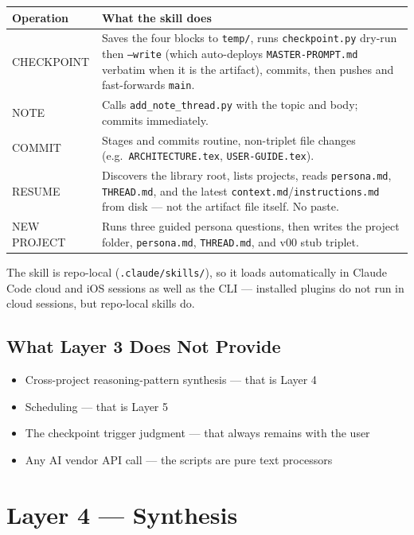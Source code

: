 \documentclass[12pt,letterpaper]{article}
\begin{document}
\begin{center}
\begin{tabular}{@{}lp{8.5cm}@{}}
\toprule
\textbf{Operation} & \textbf{What the skill does} \\
\midrule
CHECKPOINT & Saves the four blocks to \texttt{temp/}, runs
\texttt{checkpoint.py} dry-run then \texttt{--write} (which
auto-deploys \texttt{MASTER-PROMPT.md} verbatim when it is the
artifact), commits, then pushes and fast-forwards \texttt{main}. \\
NOTE & Calls \texttt{add\_note\_thread.py} with the topic and body;
commits immediately. \\
COMMIT & Stages and commits routine, non-triplet file changes (e.g.\
\texttt{ARCHITECTURE.tex}, \texttt{USER-GUIDE.tex}). \\
RESUME & Discovers the library root, lists projects, reads
\texttt{persona.md}, \texttt{THREAD.md}, and the latest
\texttt{context.md}/\texttt{instructions.md} from disk --- not the
artifact file itself. No paste. \\
NEW PROJECT & Runs three guided persona questions, then writes the
project folder, \texttt{persona.md}, \texttt{THREAD.md}, and v00 stub
triplet. \\
\bottomrule
\end{tabular}
\end{center}

The skill is repo-local (\texttt{.claude/skills/}), so it loads
automatically in Claude Code cloud and iOS sessions as well as the
CLI --- installed plugins do not run in cloud sessions, but repo-local
skills do.

\subsection{What Layer 3 Does Not Provide}

\begin{itemize}
  \item Cross-project reasoning-pattern synthesis --- that is Layer 4
  \item Scheduling --- that is Layer 5
  \item The checkpoint trigger judgment --- that always remains with the user
  \item Any AI vendor API call --- the scripts are pure text processors
\end{itemize}

\section{Layer 4 --- Synthesis}
\end{document}
